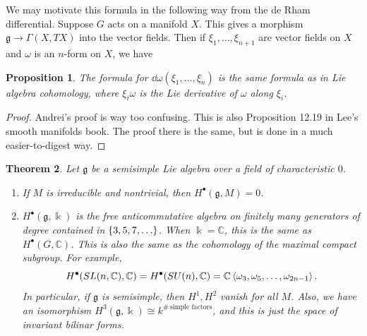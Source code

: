 \documentclass[leqno, openany]{memoir}
\newtheorem{thm}{Theorem}[section]
\newtheorem{prop}[thm]{Proposition}
\theoremstyle{definition}
\theoremstyle{remark}
\theoremstyle{plain}
\theoremstyle{definition}
\theoremstyle{remark}
\newcommand{\C}{\mathbb{C}}
\renewcommand{\k}{\Bbbk}
\newcommand{\mf}[1]{\mathfrak{#1}}
\begin{document}
We may motivate this formula in the following way from the de Rham differential. Suppose $G$ acts on a manifold $X$. This gives a morphism $\mf{g} \to \Gamma(X, TX)$ into the vector fields. Then if $\xi_1, \ldots, \xi_{n+1}$ are vector fields on $X$ and $\omega$ is an $n$-form on $X$, we have
\begin{prop}
    The formula for $\dd{\omega} (\xi_1, \ldots, \xi_n)$ is the same formula as in Lie algebra cohomology, where $\xi_i \omega$ is the Lie derivative of $\omega$ along $\xi_i$.
\end{prop}

\begin{proof}
    Andrei's proof is way too confusing. This is also Proposition 12.19 in Lee's smooth manifolds book. The proof there is the same, but is done in a much easier-to-digest way.
\end{proof}

\begin{thm}
    Let $\mf{g}$ be a semisimple Lie algebra over a field of characteristic $0$.
    \begin{enumerate}
        \item If $M$ is irreducible and nontrivial, then $H^{\bullet}(\mf{g}, M) = 0$.
        \item $H^{\bullet}(\mf{g}, \k)$ is the free anticommutative algebra on finitely many generators of degree contained in $\qty{3, 5, 7, \ldots}$. When $\k = \C$, this is the same as $H^{\bullet}(G, \C)$. This is also the same as the cohomology of the maximal compact subgroup. For example, 
            \[ H^{\bullet}(SL(n, \C), \C) = H^{\bullet}(SU(n), \C) = \C\ev{\omega_3, \omega_5, \ldots, \omega_{2n-1}}. \]
            In particular, if $\mf{g}$ is semisimple, then $H^{1}, H^2$ vanish for all $M$. Also, we have an isomorphism $H^3(\mf{g}, \k) \cong k^{\#\ \text{simple factors}}$, and this is just the space of invariant bilinar forms.
    \end{enumerate}
\end{thm}
\end{document}
